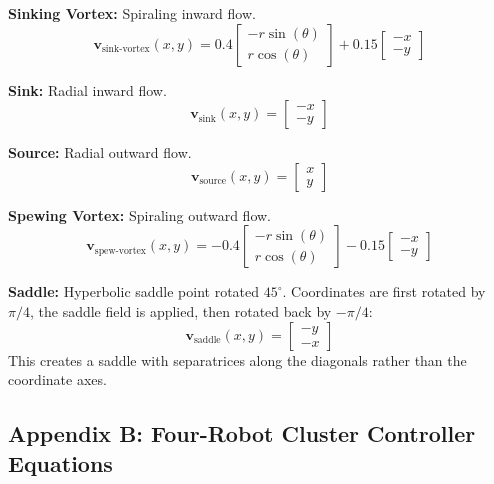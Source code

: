 \documentclass[lettersize,journal]{IEEEtran}
\begin{document}
\textbf{Sinking Vortex:} Spiraling inward flow.
\begin{equation}
\mathbf{v}_{\text{sink-vortex}}(x, y) = 0.4 \begin{bmatrix} -r \sin(\theta) \\ r \cos(\theta) \end{bmatrix} + 0.15 \begin{bmatrix} -x \\ -y \end{bmatrix}
\end{equation}

\textbf{Sink:} Radial inward flow.
\begin{equation}
\mathbf{v}_{\text{sink}}(x, y) = \begin{bmatrix} -x \\ -y \end{bmatrix}
\end{equation}

\textbf{Source:} Radial outward flow.
\begin{equation}
\mathbf{v}_{\text{source}}(x, y) = \begin{bmatrix} x \\ y \end{bmatrix}
\end{equation}

\textbf{Spewing Vortex:} Spiraling outward flow.
\begin{equation}
\mathbf{v}_{\text{spew-vortex}}(x, y) = -0.4 \begin{bmatrix} -r \sin(\theta) \\ r \cos(\theta) \end{bmatrix} - 0.15 \begin{bmatrix} -x \\ -y \end{bmatrix}
\end{equation}

\textbf{Saddle:} Hyperbolic saddle point rotated $45^\circ$. Coordinates are first rotated by $\pi/4$, the saddle field is applied, then rotated back by $-\pi/4$:
\begin{equation}
\mathbf{v}_{\text{saddle}}(x, y) = \begin{bmatrix} -y \\ -x \end{bmatrix}
\end{equation}
This creates a saddle with separatrices along the diagonals rather than the coordinate axes.

\subsection{Appendix B: Four-Robot Cluster Controller Equations}
\vspace{-0.3em}
\end{document}
